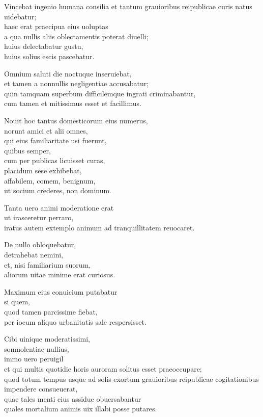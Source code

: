 \documentclass[a5paper,twoside]{article}
\begin{document}
Vincebat ingenio humana consilia et tantum grauioribus reipublicae curis natus uidebatur; \\
haec erat praecipua eius uoluptas \\
a qua nullis aliis oblectamentis poterat diuelli; \\
huius delectabatur gustu, \\
huius solius escis pascebatur. 

Omnium saluti die noctuque inseruiebat, \\
et tamen a nonnullis negligentiae accusabatur; \\
quin tamquam superbum difficilemque ingrati criminabantur, \\
cum tamen et mitissimus esset et facillimus. 

Nouit hoc tantus domesticorum eius numerus, \\
norunt amici et alii omnes, \\
qui eius familiaritate usi fuerunt, \\
quibus semper, \\
cum per publicas licuisset curas, \\
placidum sese exhibebat, \\
affabilem, comem, benignum, \\
ut socium crederes, non dominum.

Tanta uero animi moderatione erat \\
ut irasceretur perraro, \\
iratus autem extemplo animum ad tranquillitatem reuocaret. 

De nullo obloquebatur, \\
detrahebat nemini, \\
et, nisi familiarium suorum, \\
aliorum uitae minime erat curiosus. 

Maximum eius conuicium putabatur \\
si quem, \\
quod tamen parcissime fiebat, \\
per iocum aliquo urbanitatis sale respersisset.

Cibi uinique moderatissimi, \\
somnolentiae nullius, \\
immo uero peruigil \\
et qui multis quotidie horis auroram solitus esset praeoccupare; \\
quod totum tempus usque ad solis exortum grauioribus reipublicae cogitationibus impendere consueuerat, \\
quae tales menti eius assidue obuersabantur \\
quales mortalium animis uix illabi posse putares. 
\end{document}
